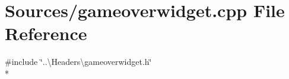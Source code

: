 \section{Sources/gameoverwidget.cpp File Reference}
\label{gameoverwidget_8cpp}
{\ttfamily \#include \char`\"{}..\textbackslash{}\+Headers\textbackslash{}gameoverwidget.\+h\char`\"{}}\\*

